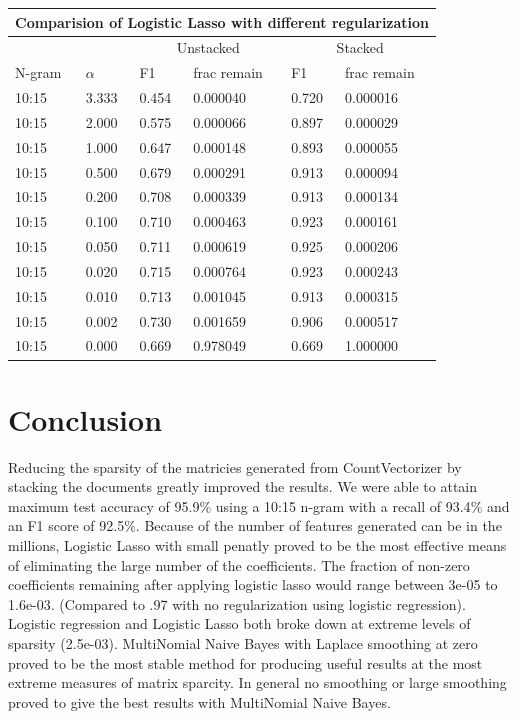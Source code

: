 \documentclass[11pt]{article}
\begin{document}
{\noindent \begin{tabular}{ |p{2cm}||p{2cm}|p{2cm}|p{2cm}|p{2cm}|p{2cm}|  }
 \hline
 \multicolumn{6}{|c|}{Comparision of Logistic Lasso with different regularization} \\
 \hline
 \multicolumn{1}{|c|}{} &
 \multicolumn{1}{|c|}{} &
 \multicolumn{2}{|c|}{Unstacked} &
 \multicolumn{2}{|c|}{Stacked}\\
 \hline
 N-gram & $\alpha$ & F1 & frac remain & F1 & frac remain\\
 \hline

10:15 &  3.333 & 0.454 & 0.000040 & 0.720 & 0.000016 \\
10:15 &  2.000 & 0.575 & 0.000066 & 0.897 & 0.000029 \\
10:15 &  1.000 & 0.647 & 0.000148 & 0.893 & 0.000055 \\
10:15 &  0.500 & 0.679 & 0.000291 & 0.913 & 0.000094 \\
10:15 &  0.200 & 0.708 & 0.000339 & 0.913 & 0.000134 \\
10:15 &  0.100 & 0.710 & 0.000463 & 0.923 & 0.000161 \\
10:15 &  0.050 & 0.711 & 0.000619 & 0.925 & 0.000206 \\
10:15 &  0.020 & 0.715 & 0.000764 & 0.923 & 0.000243 \\
10:15 &  0.010 & 0.713 & 0.001045 & 0.913 & 0.000315 \\
10:15 &  0.002 & 0.730 & 0.001659 & 0.906 & 0.000517 \\
10:15 &  0.000 & 0.669 & 0.978049 & 0.669 & 1.000000 \\
 \hline
\end{tabular}





\section{Conclusion}
Reducing the sparsity of the matricies generated from CountVectorizer by stacking the documents greatly improved the results.
We were able to attain maximum test accuracy of 95.9$\%$ using a 10:15 n-gram with a recall of 93.4$\%$ and an F1 score of 92.5$\%$.
Because of the number of features generated can be in the millions, Logistic Lasso with small penatly proved to be the most effective 
means of eliminating the large number of the coefficients. 
The fraction of non-zero coefficients remaining after applying logistic lasso
would range between 3e-05 to 1.6e-03.  (Compared to .97 with no regularization using logistic regression).
Logistic regression and Logistic Lasso both broke down at extreme levels of sparsity 
(2.5e-03). 
MultiNomial Naive Bayes with Laplace smoothing at zero proved to be the most stable method for producing useful results at the
most extreme measures of matrix sparcity.  In general no smoothing or large smoothing proved to give the best results with
MultiNomial Naive Bayes.

}
\end{document}
